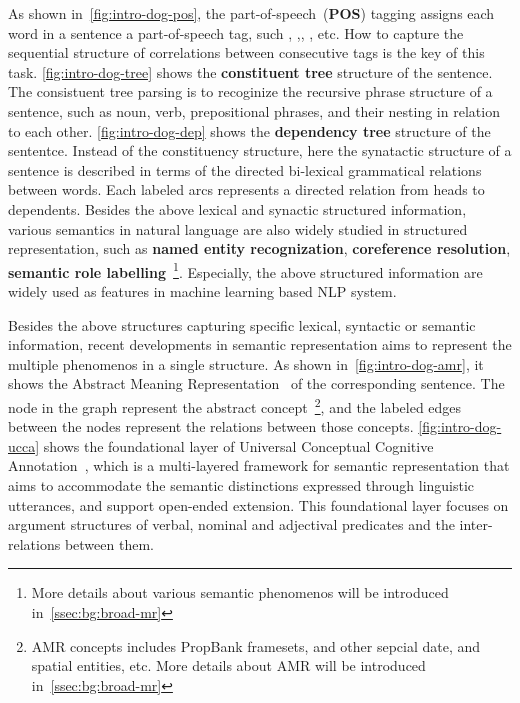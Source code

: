  As shown in~\autoref{fig:intro-dog-pos},
  the part-of-speech~(\textbf{POS}) tagging assigns each word in a sentence a
  part-of-speech tag, such , ,,
  , etc. How to capture the sequential structure of
  correlations between consecutive tags is the key of this task.
  \autoref{fig:intro-dog-tree} shows the \textbf{constituent tree} structure of
  the sentence. The consistuent tree parsing is to recoginize the
  recursive phrase structure of a sentence, such as noun, verb,
  prepositional phrases, and their nesting in relation to each
  other. \autoref{fig:intro-dog-dep} shows the \textbf{dependency tree}
  structure of the sententce. Instead of the constituency structure,
  here the synatactic structure of a sentence is described in terms of
  the directed bi-lexical grammatical relations between words. Each
  labeled arcs represents a directed relation from heads to
  dependents. Besides the above lexical and synactic structured
  information, various semantics in natural language are also widely
  studied in structured representation, such as \textbf{named entity
  recognization}, \textbf{coreference resolution}, \textbf{semantic role
  labelling}~\footnote{More details about various semantic phenomenos
    will be introduced in~\autoref{ssec:bg:broad-mr}}. Especially, the
  above structured information are widely used as features in machine
  learning based NLP system.

 Besides
  the above structures capturing specific lexical, syntactic or
  semantic information, recent developments in semantic representation
  aims to represent the multiple phenomenos in a single structure. As
  shown in~\autoref{fig:intro-dog-amr}, it shows the
  Abstract Meaning
  Representation~\citep[\textbf{AMR},][]{Ban:Bon:Cai:13} of the
  corresponding sentence. The node in the graph represent the abstract
  concept~\footnote{AMR concepts includes PropBank framesets, and
    other sepcial date, and spatial entities, etc. More details about AMR will be introduced in~\autoref{ssec:bg:broad-mr}}, and the labeled
  edges between the nodes represent the relations between those
  concepts.  \autoref{fig:intro-dog-ucca} shows the foundational layer
  of Universal Conceptual Cognitive
  Annotation~\citep[\textbf{UCCA},][]{Abe:Rap:13b}, which is a
  multi-layered framework for semantic representation that aims to
  accommodate the semantic distinctions expressed through linguistic
  utterances, and support open-ended extension. This foundational
  layer focuses on argument structures of verbal, nominal and
  adjectival predicates and the inter-relations between them.

